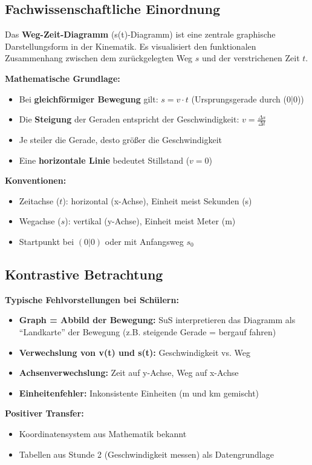\documentclass[11pt,a4paper]{article}
\begin{document}
\subsection{Fachwissenschaftliche Einordnung}
Das \textbf{Weg-Zeit-Diagramm} (s(t)-Diagramm) ist eine zentrale graphische Darstellungsform in der Kinematik. Es visualisiert den funktionalen Zusammenhang zwischen dem zurückgelegten Weg $s$ und der verstrichenen Zeit $t$.

\textbf{Mathematische Grundlage:}
\begin{itemize}
    \item Bei \textbf{gleichförmiger Bewegung} gilt: $s = v \cdot t$ (Ursprungsgerade durch (0|0))
    \item Die \textbf{Steigung} der Geraden entspricht der Geschwindigkeit: $v = \frac{\Delta s}{\Delta t}$
    \item Je steiler die Gerade, desto größer die Geschwindigkeit
    \item Eine \textbf{horizontale Linie} bedeutet Stillstand ($v = 0$)
\end{itemize}

\textbf{Konventionen:}
\begin{itemize}
    \item Zeitachse ($t$): horizontal (x-Achse), Einheit meist Sekunden (s)
    \item Wegachse ($s$): vertikal (y-Achse), Einheit meist Meter (m)
    \item Startpunkt bei $(0|0)$ oder mit Anfangsweg $s_0$
\end{itemize}

\subsection{Kontrastive Betrachtung}
\textbf{Typische Fehlvorstellungen bei Schülern:}
\begin{itemize}
    \item \textbf{Graph = Abbild der Bewegung:} SuS interpretieren das Diagramm als ``Landkarte'' der Bewegung (z.B. steigende Gerade = bergauf fahren)
    \item \textbf{Verwechslung von v(t) und s(t):} Geschwindigkeit vs. Weg
    \item \textbf{Achsenverwechslung:} Zeit auf y-Achse, Weg auf x-Achse
    \item \textbf{Einheitenfehler:} Inkonsistente Einheiten (m und km gemischt)
\end{itemize}

\textbf{Positiver Transfer:}
\begin{itemize}
    \item Koordinatensystem aus Mathematik bekannt
    \item Tabellen aus Stunde 2 (Geschwindigkeit messen) als Datengrundlage
\end{itemize}
\end{document}
